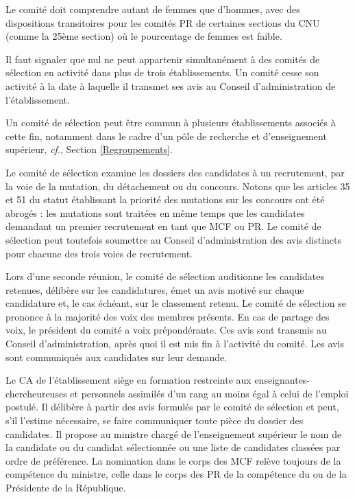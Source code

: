 Le comit\'e doit comprendre autant de femmes que d’hommes, avec des dispositions transitoires pour les comit\'es PR de certaines sections du CNU 
(comme la 25\`eme section) o\`u le pourcentage de femmes est faible.

Il faut signaler que nul ne peut appartenir simultan\'ement \`a des comit\'es de s\'election en activit\'e dans plus de trois
\'etablissements. Un comit\'e cesse son activit\'e \`a la date \`a laquelle il transmet ses avis au Conseil d'administration
de l'\'etablissement.

Un comit\'e de s\'election peut \^etre commun \`a plusieurs \'etablissements associ\'es \`a cette fin, notamment dans le
cadre d'un p\^ole de recherche et d'enseignement sup\'erieur, {\em cf.}, Section \ref{Regroupements}.

Le comit\'e de s\'election examine les dossiers des candidat\mp e\mp s \`a un recrutement, par la voie de la mutation, du
d\'etachement ou du concours. Notons que les articles 35 et 51 du statut \'etablissant la priorit\'e des mutations sur les concours ont \'et\'e abrog\'es : les mutations sont trait\'ees en m\^eme temps que les candidat\mp e\mp s demandant un premier recrutement en tant que MCF ou PR.
Le comit\'e de s\'election peut toutefois soumettre au Conseil d'administration des avis distincts pour chacune des trois voies de recrutement.

Lors d'une seconde r\'eunion, le comit\'e de s\'election auditionne les candidat\mp e\mp s retenu\mp e\mp s, d\'elib\`ere sur les candidatures, \'emet un avis motiv\'e sur chaque candidature et, le cas \'ech\'eant, sur le classement retenu. Le comit\'e de s\'election se prononce \`a la majorit\'e des voix des membres pr\'esents. En cas de partage des voix, le pr\'esident du comit\'e a voix pr\'epond\'erante. Ces avis sont transmis au Conseil
d'administration, apr\`es quoi il est mis fin \`a l'activit\'e du comit\'e. Les avis sont communiqu\'es aux candidat\mp e\mp s sur leur demande. 

Le CA de l'\'etablissement si\`ege en formation
restreinte aux enseignant\mp e\mp s-chercheur\mp euse\mp s et personnels assimil\'es d'un rang au moins \'egal \`a celui de l'emploi
postul\'e. Il d\'elib\`ere \`a partir des avis formul\'es par le comit\'e de s\'election et peut, s'il l'estime n\'ecessaire, se faire communiquer toute pi\`ece du dossier des candidat\mp e\mp s. Il propose au ministre charg\'e de l'enseignement sup\'erieur le nom de la candidate ou du candidat s\'electionn\'e\mp e ou une liste de candidat\mp e\mp s class\'e\mp e\mp s par ordre de pr\'ef\'erence. La nomination dans le corps des MCF rel\`eve toujours de la comp\'etence du ministre, celle dans le corps des PR de la comp\'etence du ou de la Pr\'esident\mp e de la R\'epublique.

